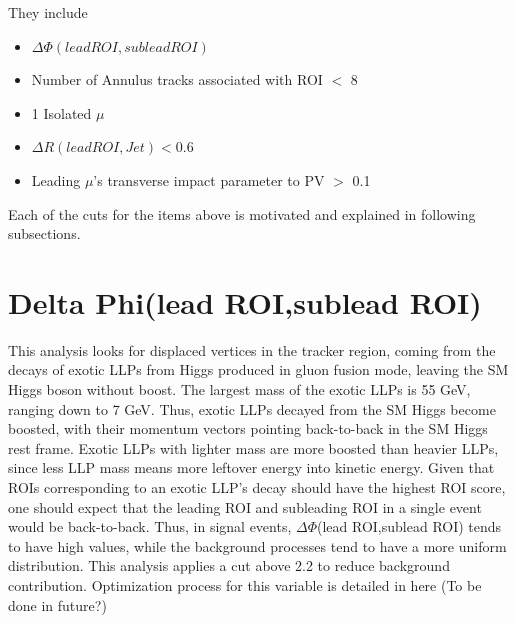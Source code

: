 They include 
\begin{itemize}
  \item $\Delta\Phi(lead ROI,sublead ROI)$ 
  \item Number of Annulus tracks associated with ROI $<$ 8
  \item 1 Isolated $\mu$
  \item $\Delta R(lead ROI, Jet)<$0.6 
  \item Leading $\mu$'s transverse impact parameter to PV $>$ 0.1
\end{itemize}

Each of the cuts for the items above is motivated and explained in following subsections.

\section{Delta Phi(lead ROI,sublead ROI)}\label{sec:DeltaPhi}
This analysis looks for displaced vertices in the tracker region, coming from the decays of exotic LLPs from Higgs produced in gluon fusion mode, leaving the SM Higgs boson without boost.
The largest mass of the exotic LLPs is 55 GeV, ranging down to 7 GeV. 
Thus, exotic LLPs decayed from the SM Higgs become boosted, with their momentum vectors pointing back-to-back in the SM Higgs rest frame. 
Exotic LLPs with lighter mass are more boosted than heavier LLPs, since less LLP mass means more leftover energy into kinetic energy.
Given that ROIs corresponding to an exotic LLP's decay should have the highest ROI score, one should expect that the leading ROI and subleading ROI in a single event would be back-to-back.
Thus, in signal events, $\Delta\Phi$(lead ROI,sublead ROI) tends to have high values, while the background processes tend to have a more uniform distribution.
This analysis applies a cut above 2.2 to reduce background contribution. 
Optimization process for this variable is detailed in here (To be done in future?)


